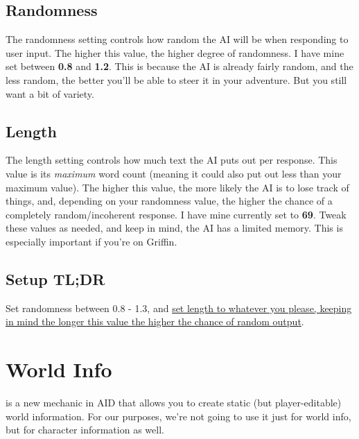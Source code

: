 \documentclass[Avsfag-main.tex]{subfiles}
\begin{document}
\section{Randomness}
\label{sec:random}

\smallskip

The randomness setting controls how random the AI will be when responding to user input.
The higher this value, the higher degree of randomness.
I have mine set between \textbf{0.8 }and \textbf{1.2}.
This is because the AI is already fairly random, and the less random, the better you'll be able to steer it in your adventure.
But you still want a bit of variety.

\section{Length}

\smallskip

The length setting controls how much text the AI puts out per response.
This value is its \emph{maximum} word count (meaning it could also put out less than your maximum value).
The higher this value, the more likely the AI is to lose track of things, and, depending on your randomness value, the higher the chance of a completely random/incoherent response.
I have mine currently set to \textbf{69}.
Tweak these values as needed, and keep in mind, the AI has a limited memory.
This is especially important if you're on Griffin.

\section{Setup TL;DR}

Set randomness between 0.8 - 1.3, and \ul{set length to whatever you please, keeping in mind the longer this value the higher the chance of random output}.

\chapter{World Info}
\label{ch:wi}

\smallskip

\wi is a new mechanic in AID that allows you to create static (but player-editable) world information.
For our purposes, we're not going to use it just for world info, but for character information as well.
\end{document}
